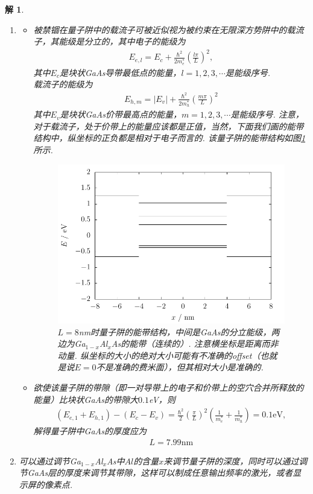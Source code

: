 \documentclass[UTF8,10pt,a4paper]{article}
\theoremstyle{Problem}
\theoremstyle{Solution}
\newtheorem*{sol}{解}
\providecommand{\abs}[1]{\left\lvert#1\right\rvert}
\begin{document}
\begin{sol}
    \begin{enumerate}
        \item[(a)]
        \begin{itemize}
            \item[$\triangleright$] 被禁锢在量子阱中的载流子可被近似视为被约束在无限深方势阱中的载流子，其能级是分立的，其中电子的能级为
            \begin{align}
                E_{e,l}=E_c+\frac{\hbar^2}{2m_e^*}\left(\frac{l\pi}{L}\right)^2,
            \end{align}
            其中$E_c$是块状GaAs导带最低点的能量，$l=1,2,3,\cdots$是能级序号.\\
            载流子的能级为
            \begin{align}
                E_{h,m}=\abs{E_v}+\frac{\hbar^2}{2m_h^*}\left(\frac{m\pi}{L}\right)^2
            \end{align}
            其中$E_v$是块状GaAs价带最高点的能量，$m=1,2,3,\cdots$是能级序号. 注意，对于载流子，处于价带上的能量应该都是正值，当然，下面我们画的能带结构中，纵坐标的正负都是相对于电子而言的. 该量子阱的能带结构如图\ref{1-bandstructure}所示.
            \begin{figure}[h]
                \centering
                \includegraphics[width=.5\textwidth]{1-bandstructure.pdf}
                \caption{$L=8$nm时量子阱的能带结构，中间是GaAs的分立能级，两边为Ga$_{1-x}$Al$_x$As的能带（连续的）. 注意横坐标是距离而非动量. 纵坐标的大小的绝对大小可能有不准确的offset（也就是说$E=0$不是准确的费米面），但其相对大小是准确的.}
                \label{1-bandstructure}
            \end{figure}
            \item[$\triangleright$] 欲使该量子阱的带隙（即一对导带上的电子和价带上的空穴合并所释放的能量）比块状GaAs的带隙大$0.1$eV，则
            \begin{align}
                (E_{e,1}+E_{h,1})-(E_c-E_v)=\frac{\hbar^2}{2}\left(\frac{\pi}{L}\right)^2\left(\frac{1}{m_e^*}+\frac{1}{m_h^*}\right)=0.1\text{eV},
            \end{align}
            解得量子阱中GaAs的厚度应为
            \begin{align}
                L=7.99\text{nm}
            \end{align}
        \end{itemize}
        \item[(b)] 可以通过调节Ga$_{1-x}$Al$_x$As中$Al$的含量$x$来调节量子阱的深度，同时可以通过调节GaAs层的厚度来调节其带隙，这样可以制成任意输出频率的激光，或者显示屏的像素点.
    \end{enumerate}
\end{sol}
\end{document}
